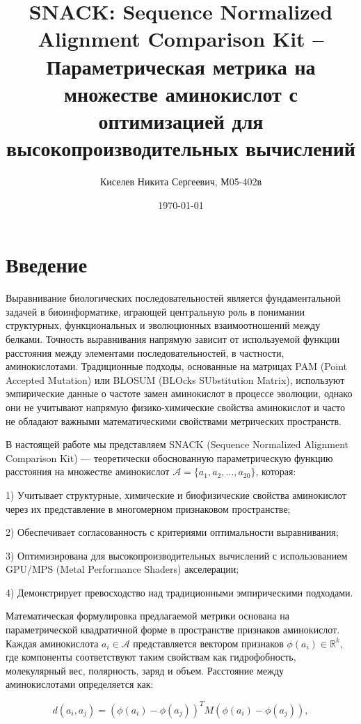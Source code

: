 \documentclass[12pt]{article}
\title{SNACK: Sequence Normalized Alignment Comparison Kit -- \\
Параметрическая метрика на множестве аминокислот с оптимизацией для высокопроизводительных вычислений}
\author{Киселев Никита Сергеевич, М05-402в}
\date{\today}
\begin{document}
\maketitle

\section{Введение}

Выравнивание биологических последовательностей является фундаментальной задачей в биоинформатике, играющей центральную роль в понимании структурных, функциональных и эволюционных взаимоотношений между белками. Точность выравнивания напрямую зависит от используемой функции расстояния между элементами последовательностей, в частности, аминокислотами. Традиционные подходы, основанные на матрицах PAM (Point Accepted Mutation) или BLOSUM (BLOcks SUbstitution Matrix), используют эмпирические данные о частоте замен аминокислот в процессе эволюции, однако они не учитывают напрямую физико-химические свойства аминокислот и часто не обладают важными математическими свойствами метрических пространств.

В настоящей работе мы представляем SNACK (Sequence Normalized Alignment Comparison Kit) — теоретически обоснованную параметрическую функцию расстояния на множестве аминокислот $\mathcal{A} = \{a_1, a_2, \dots, a_{20}\}$, которая:

1) Учитывает структурные, химические и биофизические свойства аминокислот через их представление в многомерном признаковом пространстве;

2) Обеспечивает согласованность с критериями оптимальности выравнивания;

3) Оптимизирована для высокопроизводительных вычислений с использованием GPU/MPS (Metal Performance Shaders) акселерации;

4) Демонстрирует превосходство над традиционными эмпирическими подходами.

Математическая формулировка предлагаемой метрики основана на параметрической квадратичной форме в пространстве признаков аминокислот. Каждая аминокислота $a_i \in \mathcal{A}$ представляется вектором признаков $\phi(a_i) \in \mathbb{R}^k$, где компоненты соответствуют таким свойствам как гидрофобность, молекулярный вес, полярность, заряд и объем. Расстояние между аминокислотами определяется как:

\begin{equation}
d(a_i, a_j) = (\phi(a_i) - \phi(a_j))^T M (\phi(a_i) - \phi(a_j)),
\end{equation}
\end{document}
